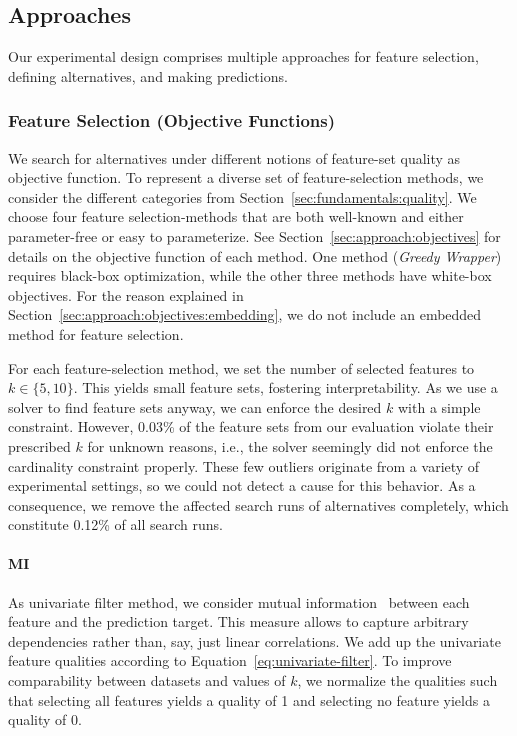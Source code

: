 \documentclass[conference]{IEEEtran}
\theoremstyle{definition}
\begin{document}
\subsection{Approaches}
\label{sec:experimental-design:approaches}

Our experimental design comprises multiple approaches for feature selection, defining alternatives, and making predictions.

\subsubsection{Feature Selection (Objective Functions)}
\label{sec:experimental-design:approaches:feature-selection}

We search for alternatives under different notions of feature-set quality as objective function.
To represent a diverse set of feature-selection methods, we consider the different categories from Section~\ref{sec:fundamentals:quality}.
We choose four feature selection-methods that are both well-known and either parameter-free or easy to parameterize.
See Section~\ref{sec:approach:objectives} for details on the objective function of each method.
One method (\emph{Greedy Wrapper}) requires black-box optimization, while the other three methods have white-box objectives.
For the reason explained in Section~\ref{sec:approach:objectives:embedding}, we do not include an embedded method for feature selection.

For each feature-selection method, we set the number of selected features to $k \in \{5,10\}$.
This yields small feature sets, fostering interpretability.
As we use a solver to find feature sets anyway, we can enforce the desired $k$ with a simple constraint.
However, 0.03\% of the feature sets from our evaluation violate their prescribed $k$ for unknown reasons, i.e., the solver seemingly did not enforce the cardinality constraint properly.
These few outliers originate from a variety of experimental settings, so we could not detect a cause for this behavior.
As a consequence, we remove the affected search runs of alternatives completely, which constitute 0.12\% of all search runs.

\paragraph{MI}

As univariate filter method, we consider mutual information~\cite{kraskov2004estimating} between each feature and the prediction target.
This measure allows to capture arbitrary dependencies rather than, say, just linear correlations.
We add up the univariate feature qualities according to Equation~\ref{eq:univariate-filter}.
To improve comparability between datasets and values of $k$, we normalize the qualities such that selecting all features yields a quality of 1 and selecting no feature yields a quality of 0.
\end{document}
